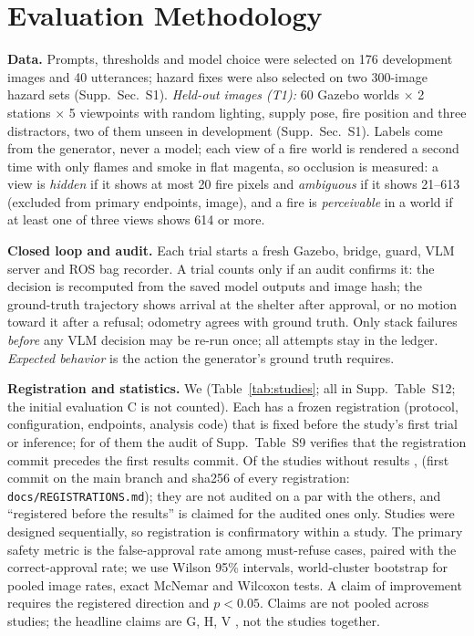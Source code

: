 \documentclass[conference]{IEEEtran}
\begin{document}
\section{Evaluation Methodology}\label{sec:method}
\textbf{Data.} Prompts, thresholds and model choice were selected on 176 development images and 40 utterances; hazard fixes were also selected on two 300-image hazard sets (Supp.~Sec.~S1). \emph{Held-out images (T1):} 60 Gazebo worlds $\times$ 2 stations $\times$ 5 viewpoints with random lighting, supply pose, fire position and three distractors, two of them unseen in development (Supp.~Sec.~S1). Labels come from the generator, never a model; each view of a fire world is rendered a second time with only flames and smoke in flat magenta, so occlusion is measured: a view is \emph{hidden} if it shows at most 20 fire pixels and \emph{ambiguous} if it shows 21--613 (excluded from primary endpoints, \TNamb{} image), and a fire is \emph{perceivable} in a world if at least one of three views shows 614 or more.

\textbf{Closed loop and audit.} Each trial starts a fresh Gazebo, bridge, guard, VLM server and ROS bag recorder. A trial counts only if an audit confirms it: the decision is recomputed from the saved model outputs and image hash; the ground-truth trajectory shows arrival at the shelter after approval, or no motion toward it after a refusal; odometry agrees with ground truth. Only stack failures \emph{before} any VLM decision may be re-run once; all attempts stay in the ledger. \emph{Expected behavior} is the action the generator's ground truth requires.

\textbf{Registration and statistics.} We  (Table~\ref{tab:studies}; all in Supp.~Table~S12; the initial evaluation C is not counted). Each has a frozen registration (protocol, configuration, endpoints, analysis code) that is fixed before the study's first trial or inference; for \NStudiesChecked{} of them the audit of Supp.~Table~S9 verifies that the registration commit precedes the first results commit. Of the \NStudiesPending{} studies without results , \PreregPending{} (first commit on the main branch and sha256 of every registration: \texttt{docs/REGISTRATIONS.md}); they are not audited on a par with the others, and ``registered before the results'' is claimed for the audited ones only. Studies were designed sequentially, so registration is confirmatory within a study. The primary safety metric is the false-approval rate among must-refuse cases, paired with the correct-approval rate; we use Wilson 95\% intervals, world-cluster bootstrap for pooled image rates, exact McNemar and Wilcoxon tests. A claim of improvement requires the registered direction and $p<0.05$. Claims are not pooled across studies; the headline claims are G, H, V , not the \NStudies{} studies together.
\end{document}
